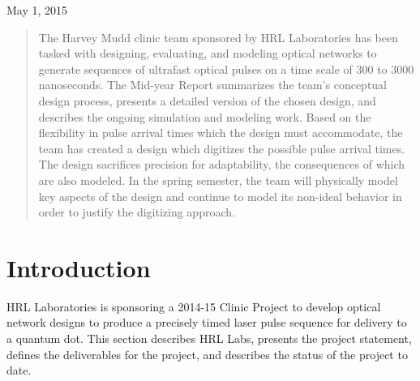 \documentclass[pdftex,12pt,a4paper]{article}
\begin{document}
\begin{titlepage}
\begin{center}
\vfill

{\large May 1, 2015}

\end{center}

\vspace*{\fill}

\end{titlepage}

\doublespacing

\tableofcontents

\newpage
\begin{abstract}
The Harvey Mudd clinic team sponsored by HRL Laboratories has been tasked with designing, evaluating, and modeling optical networks to generate sequences of ultrafast optical pulses on a time scale of 300 to 3000 nanoseconds. The Mid-year Report summarizes the team's conceptual design process, presents a detailed version of the chosen design, and describes the ongoing simulation and modeling work. Based on the flexibility in pulse arrival times which the design must accommodate, the team has created a design which digitizes the possible pulse arrival times. The design sacrifices precision for adaptability, the consequences of which are also modeled. In the spring semester, the team will physically model key aspects of the design and continue to model its non-ideal behavior in order to justify the digitizing approach.
\end{abstract}

\section{Introduction}
HRL Laboratories is sponsoring a 2014-15 Clinic Project to develop optical network designs to produce a precisely timed laser pulse sequence for delivery to a quantum dot. This section describes HRL Labs, presents the project statement, defines the deliverables for the project, and describes the status of the project to date.
\end{document}
